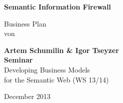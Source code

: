 \documentclass[12pt, a4paper]{article} %
\begin{document}
\thispagestyle{empty}

\begin{titlepage}
\begin{center}
\hbox{}
\vfill

{\color{blue}\huge\bfseries Semantic Information Firewall\par}
\vskip 1.8cm
Business Plan\\
von\\[2mm]
\vskip 1cm

{\large\bfseries Artem Schumilin \& Igor Tseyzer\\}
\vskip 4cm
{\bfseries Seminar}\\
Developing Business Models \\
for the Semantic Web (WS 13/14) \\
\vskip 3cm

\vskip 3cm
December 2013

\end{center}
\vfill
\end{titlepage}


\tableofcontents

\newpage




\newpage



\newpage




\newpage




\newpage



\newpage



\newpage


\newpage
\end{document}
